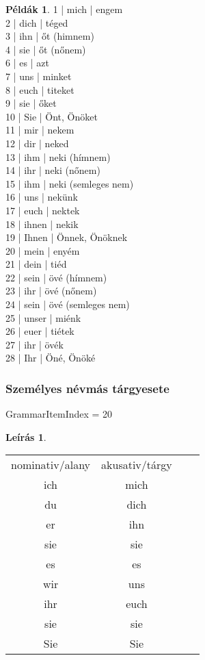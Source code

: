 \documentclass{article}
\theoremstyle{definition}
\newtheorem*{exmp}{Példák}
\newtheorem*{desc}{Leírás}
\begin{document}
\begin{exmp}
1 | mich | engem\\
2 | dich | téged\\
3 | ihn | őt (himnem)\\
4 | sie | őt (nőnem)\\
6 | es | azt\\
7 | uns | minket\\
8 | euch | titeket\\
9 | sie | őket\\
10 | Sie | Önt, Önöket\\
11 | mir | nekem\\
12 | dir | neked\\
13 | ihm | neki (hímnem)\\
14 | ihr | neki (nőnem)\\
15 | ihm | neki (semleges nem)\\
16 | uns | nekünk\\
17 | euch | nektek\\
18 | ihnen | nekik\\
19 | Ihnen | Önnek, Önöknek\\
20 | mein | enyém\\
21 | dein | tiéd\\
22 | sein | övé (hímnem)\\
23 | ihr | övé (nőnem)\\
24 | sein | övé (semleges nem)\\
25 | unser | miénk\\
26 | euer | tiétek\\
27 | ihr | övék\\
28 | Ihr | Öné, Önöké\\
\end{exmp}

\subsubsection{Személyes névmás tárgyesete}

GrammarItemIndex = 20

\begin{desc}
\begin{tabular}{cccc}
 nominativ/alany & akusativ/tárgy \\
 ich & mich \\
 du & dich \\
 er & ihn \\
 sie & sie \\
 es & es \\
 wir & uns \\
 ihr & euch \\
 sie & sie \\
 Sie & Sie \\
\end{tabular} 
\end{desc}
\end{document}
